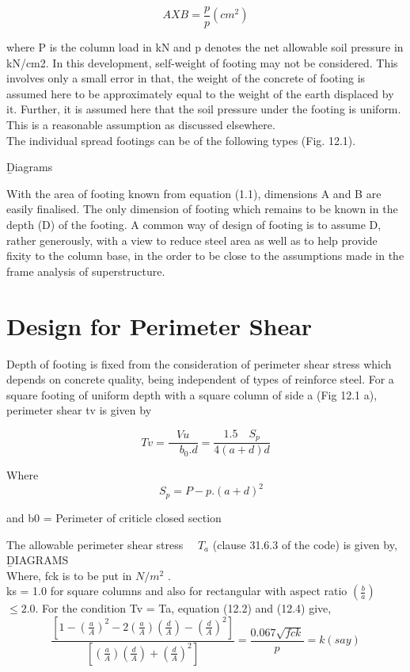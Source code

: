 \documentclass{book}
\begin{document}
\begin{equation}
AXB =\frac{p}{p} (cm^2)
\end{equation}

where P is the column load in kN and p denotes the net allowable soil pressure in kN/cm2. In
this development, self-weight of footing may not be considered. This involves only a small error
in that, the weight of the concrete of footing is assumed here to be approximately equal to the
weight of the earth displaced by it. Further, it is assumed here that the soil pressure under
the footing is uniform. This is a reasonable assumption as discussed elsewhere.\\
The individual spread footings can be of the following types (Fig. 12.1).
\newpage

\b Diagrams
\par With the area of footing known from equation (1.1), dimensions A and B are easily finalised. The only dimension of footing which remains to be known in the depth (D) of the footing. A common way of design of footing is to assume D, rather generously, with a view to reduce steel area as well as to help provide fixity to the column base, in the order to be close to the assumptions made in the frame analysis of superstructure.

\section{Design for Perimeter Shear}
Depth of footing is fixed from the consideration of perimeter shear stress which depends on concrete quality, being independent of types of reinforce steel. For a square footing of uniform depth with a square column of side a (Fig 12.1 a), perimeter shear tv is given by

\begin{equation}
Tv = \frac{Vu} {\quad{b_0}.d} 
=\frac{1.5 \quad S_p} {4(a+d)d} 
\end{equation}

Where 
\begin{equation}
\quad S_p = P-p . (a+d)^2
\end{equation}

and b0 = Perimeter of criticle closed section
\par The allowable perimeter shear stress
$\quad{T_a}$  
(clause 31.6.3 of the code) is given by,
\newpage
\b DIAGRAMS \\ 
Where, fck is to be put in $N/m^2$ .\\
 ks = 1.0 for square columns and also for rectangular with aspect ratio  $\left( \frac{b}{a} \right)$ $\leq {2.0}$. For the condition Tv = Ta, equation (12.2) and (12.4) give,
\begin{equation}
\frac{\left[1-\left( \frac{a}{A} \right)^2-2\left(\frac{a}{A}\right)\left(\frac{d}{A}\right)-\left(\frac{d}{A} \right)^2 \right]}
{\left[\left(\frac{a}{A}\right)\left(\frac{d}{A}\right)+\left(\frac{d}{A}\right)^2 \right]}
=\frac{0.067\sqrt{fck}}{p}
=k(say)
\end{equation}
\end{document}
